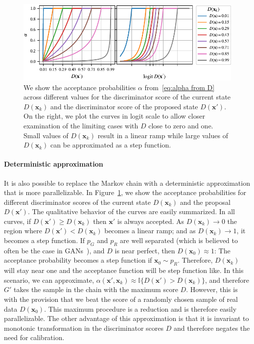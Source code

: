 \documentclass{article}
\renewcommand{\vec}[1]{{\boldsymbol{\mathbf{#1}}}} %
\newcommand{\I}{\mathbb{I}}
\newcommand{\sample}{\sim}
\newcommand{\PG}{{p_G}}
\newcommand{\PR}{{p_R}}
\newcommand{\accept}{\alpha}
\begin{document}
\begin{figure}
    \centering
    \includegraphics[width=\textwidth]{figures/alpha2.pdf}
    \caption{{\small
    We show the acceptance probabilities $\accept$ from~\eqref{eq:alpha from D} across different values for the discriminator score of the current state $D(\vec x_k)$ and the discriminator score of the proposed state $D(\vec x')$.
    On the right, we plot the curves in logit scale to allow closer examination of the limiting cases with $D$ close to zero and one.
    Small values of $D(\vec x_k)$ result in a linear ramp while large values of $D(\vec x_k)$ can be approximated as a step function.
    }}
    \label{fig:alpha}
\end{figure}

\paragraph{Deterministic approximation}
It is also possible to replace the Markov chain with a deterministic approximation that is more parallelizable.
In Figure~\ref{fig:alpha}, we show the acceptance probabilities for different discriminator scores of the current state $D(\vec x_k)$ and the proposal $D(\vec x')$.
The qualitative behavior of the curves are easily summarized.
In all curves, if $D(\vec x') \geq D(\vec x_k)$ then $\vec x'$ is always accepted.
As $D(\vec x_k) \rightarrow 0$ the region where $D(\vec x') < D(\vec x_k)$ becomes a linear ramp; and as $D(\vec x_k) \rightarrow 1$, it becomes a step function.
If $\PG$ and $\PR$ are well separated (which is believed to often be the case in GANs~\citep{Arjovsky2017}), and $D$ is near perfect, then $D(\vec x_0) \approx 1$: The acceptance probability becomes a step function if $\vec x_0 \sample \PR$.
Therefore, $D(\vec x_k)$ will stay near one and the acceptance function will be step function like.
In this scenario, we can approximate, $\accept(\vec x', \vec x_k) \approx \I\{D(\vec x') > D(\vec x_k)\}$, and therefore $G'$ takes the sample in the chain with the maximum score $D$.
However, this is with the provision that we beat the score of a randomly chosen sample of real data $D(\vec x_0)$.
This maximum procedure is a reduction and is therefore easily parallelizable.
The other advantage of this approximation is that it is invariant to monotonic transformation in the discriminator scores $D$ and therefore negates the need for calibration.
\end{document}
